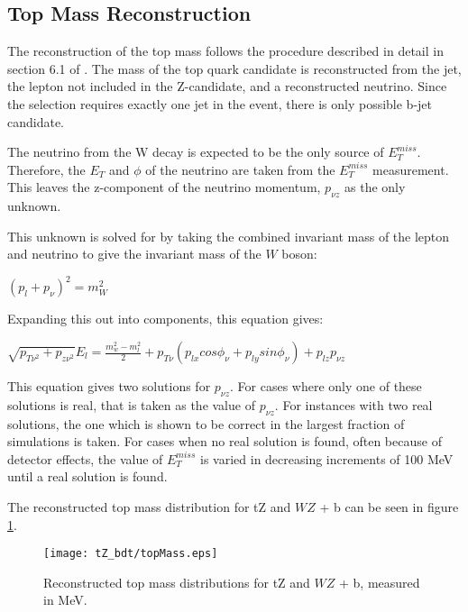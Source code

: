 
\subsection{Top Mass Reconstruction}
\label{subsec:topMass}

 The reconstruction of the top mass follows the procedure described in detail in section 6.1 of \cite{ttZ_paper}. The mass of the top quark candidate is reconstructed from the jet, the lepton not included in the Z-candidate, and a reconstructed neutrino. Since the selection requires exactly one jet in the event, there is only possible b-jet candidate. 

The neutrino from the W decay is expected to be the only source of $E_T^{miss}$. Therefore, the $E_T$ and $\phi$ of the neutrino are taken from the $E_T^{miss}$ measurement. This leaves the z-component of the neutrino momentum, $p_{\nu z}$ as the only unknown.

This unknown is solved for by taking the combined invariant mass of the lepton and neutrino to give the invariant mass of the $W$ boson:

\begin{center}
   $(p_l + p_{\nu})^2 = m_W^2$ \\ 
\end{center} 

Expanding this out into components, this equation gives:

\begin{center}
   $\sqrt{p_{T\nu^2}+p_{z\nu^2}}E_l = \frac{m^2_w-m^2_l}{2}+p_{T\nu}(p_{lx} cos\phi_\nu + p_{ly} sin \phi_\nu) + p_{lz} p_{\nu z}$ \\ 
\end{center} 

This equation gives two solutions for $p_{\nu z}$. For cases where only one of these solutions is real, that is taken as the value of $p_{\nu z}$. For instances with two real solutions, the one which is shown to be correct in the largest fraction of simulations is taken. For cases when no real solution is found, often because of detector effects, the value of $E_T^{miss}$ is varied in decreasing increments of 100 MeV until a real solution is found.

The reconstructed top mass distribution for tZ and $WZ$ + b can be seen in figure \ref{fig:topMass}.

\begin{figure}
    \centering
    \texttt{[image: tZ\_bdt/topMass.eps]}
    \caption{Reconstructed top mass distributions for tZ and $WZ$ + b, measured in MeV.}
    \label{fig:topMass}
\end{figure}

